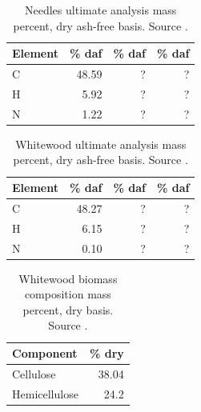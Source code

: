 \begin{table}[H]
    \centering
    \caption{Needles ultimate analysis mass percent, dry ash-free basis. Source \cite{Unknown-2019}.}
    \begin{tabular}{lrrr}
        \toprule
        Element & \% daf & \% daf & \% daf \\
        \midrule
        C        & 48.59 & ? & ? \\
        H        & 5.92  & ? & ? \\
        N        & 1.22  & ? & ? \\
        \bottomrule
    \end{tabular}
\end{table}

\begin{table}[H]
    \centering
    \caption{Whitewood ultimate analysis mass percent, dry ash-free basis. Source \cite{Unknown-2019}.}
    \begin{tabular}{lrrr}
        \toprule
        Element & \% daf & \% daf & \% daf \\
        \midrule
        C        & 48.27 & ? & ? \\
        H        & 6.15  & ? & ? \\
        N        & 0.10  & ? & ? \\
        \bottomrule
    \end{tabular}
\end{table}

\begin{table}[H]
    \centering
    \caption{Whitewood biomass composition mass percent, dry basis. Source \cite{Unknown-2020}.}
    \begin{tabular}{lr}
        \toprule
        Component & \% dry \\
        \midrule
        Cellulose       & 38.04 \\
        Hemicellulose   & 24.2  \\
        \bottomrule
    \end{tabular}
\end{table}
